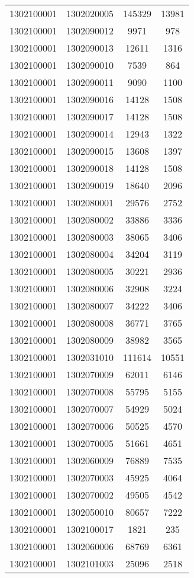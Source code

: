 \begin{longtable}{llcc}
1302100001 & 1302020005 & 145329 & 13981\\
1302100001 & 1302090012 & 9971 & 978\\
1302100001 & 1302090013 & 12611 & 1316\\
1302100001 & 1302090010 & 7539 & 864\\
1302100001 & 1302090011 & 9090 & 1100\\
1302100001 & 1302090016 & 14128 & 1508\\
1302100001 & 1302090017 & 14128 & 1508\\
1302100001 & 1302090014 & 12943 & 1322\\
1302100001 & 1302090015 & 13608 & 1397\\
1302100001 & 1302090018 & 14128 & 1508\\
1302100001 & 1302090019 & 18640 & 2096\\
1302100001 & 1302080001 & 29576 & 2752\\
1302100001 & 1302080002 & 33886 & 3336\\
1302100001 & 1302080003 & 38065 & 3406\\
1302100001 & 1302080004 & 34204 & 3119\\
1302100001 & 1302080005 & 30221 & 2936\\
1302100001 & 1302080006 & 32908 & 3224\\
1302100001 & 1302080007 & 34222 & 3406\\
1302100001 & 1302080008 & 36771 & 3765\\
1302100001 & 1302080009 & 38982 & 3565\\
1302100001 & 1302031010 & 111614 & 10551\\
1302100001 & 1302070009 & 62011 & 6146\\
1302100001 & 1302070008 & 55795 & 5155\\
1302100001 & 1302070007 & 54929 & 5024\\
1302100001 & 1302070006 & 50525 & 4570\\
1302100001 & 1302070005 & 51661 & 4651\\
1302100001 & 1302060009 & 76889 & 7535\\
1302100001 & 1302070003 & 45925 & 4064\\
1302100001 & 1302070002 & 49505 & 4542\\
1302100001 & 1302050010 & 80657 & 7222\\
1302100001 & 1302100017 & 1821 & 235\\
1302100001 & 1302060006 & 68769 & 6361\\
1302100001 & 1302101003 & 25096 & 2518\\

\end{longtable}
